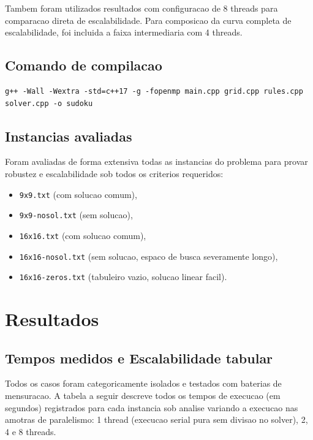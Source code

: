 \documentclass[11pt,a4paper]{article}
\begin{document}
Tambem foram utilizados resultados com configuracao de 8 threads para comparacao direta de escalabilidade.
Para composicao da curva completa de escalabilidade, foi incluida a faixa intermediaria com 4 threads.

\subsection{Comando de compilacao}
\begin{lstlisting}[basicstyle=\ttfamily\small,frame=single]
g++ -Wall -Wextra -std=c++17 -g -fopenmp main.cpp grid.cpp rules.cpp solver.cpp -o sudoku
\end{lstlisting}

\subsection{Instancias avaliadas}
Foram avaliadas de forma extensiva todas as instancias do problema para provar robustez e escalabilidade sob todos os criterios requeridos:
\begin{itemize}
  \item \texttt{9x9.txt} (com solucao comum),
  \item \texttt{9x9-nosol.txt} (sem solucao),
  \item \texttt{16x16.txt} (com solucao comum),
  \item \texttt{16x16-nosol.txt} (sem solucao, espaco de busca severamente longo),
  \item \texttt{16x16-zeros.txt} (tabuleiro vazio, solucao linear facil).
\end{itemize}

\section{Resultados}

\subsection{Tempos medidos e Escalabilidade tabular}
Todos os casos foram categoricamente isolados e testados com baterias de mensuracao. A tabela a seguir descreve todos os tempos de execucao (em segundos) registrados para cada instancia sob analise variando a execucao nas amotras de paralelismo: 1 thread (execucao serial pura sem divisao no solver), 2, 4 e 8 threads. 
\end{document}
